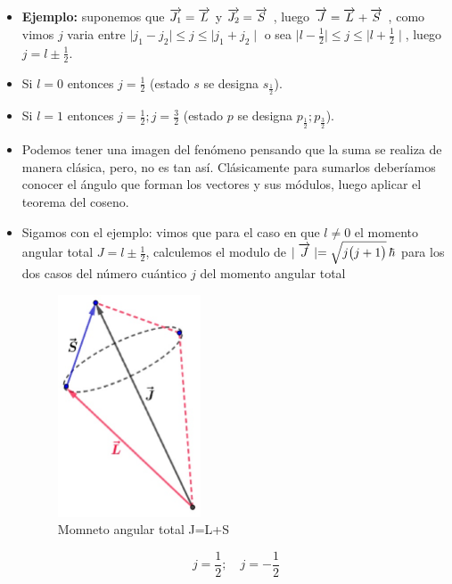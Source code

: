\begin{itemize}
	\item \textbf{Ejemplo:} suponemos que $\overrightarrow{J_{1}}=\overrightarrow{L}$  y $\overrightarrow{J_{2}}=\overrightarrow{S}$ , luego $\overrightarrow{J}=\overrightarrow{L}+\overrightarrow{S}$ , como vimos $j$ varia entre $\mid j_{1}-j_{2} \mid \leq j \leq \mid j_{1}+j_{2} \mid$ o sea $\mid l-\frac{1}{2} \mid \leq j \leq \mid l+\frac{1}{2} \mid$, luego $j=l\pm\frac{1}{2}$.
	\item Si $l=0$ entonces $j=\frac{1}{2}$ (estado $s$ se designa $s_{\frac{1}{2}}$).	
	\item Si $l=1$ entonces $j=\frac{1}{2}; j=\frac{3}{2}$ (estado $p$ se designa $p_{\frac{1}{2}}; p_{\frac{3}{2}}$).
	\item Podemos tener una imagen del fenómeno pensando que la suma se realiza de manera clásica, pero, no es tan así. Clásicamente para sumarlos deberíamos conocer el ángulo que forman los vectores y sus módulos, luego aplicar el teorema del coseno.
	\item Sigamos con el ejemplo: vimos que para el caso en que $l\neq0$ el momento angular total $J=l\pm\frac{1}{2}$, calculemos el modulo de $\mid\overrightarrow{J}\mid =\sqrt{j\big(j+1\big)}\,\hbar$ para los dos casos del número cuántico $j$ del momento angular total


\begin{figure}[H]
    \centering
    \includegraphics[width=0.4\textwidth]{./Figures/GraficoJLS}
	\caption{Momneto angular total J=L+S}
	\label{fig:GraficoJLS}
\end{figure}



\begin{equation}
	j=\frac{1}{2} ;\quad j=-\frac{1}{2}
\end{equation}	
\end{itemize}

